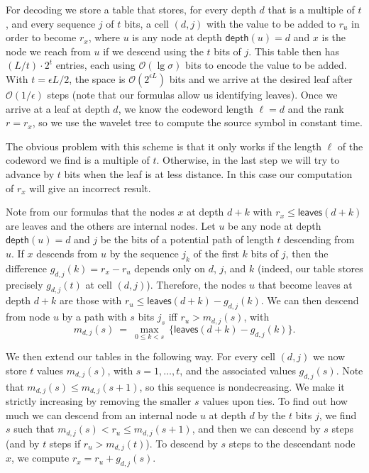 \documentclass[preprint,12pt]{elsarticle}
\newcommand{\Oh}[1]{\ensuremath{\mathcal{O}\!\left({#1}\right)}}
\newcommand{\depth}{\ensuremath{\mathsf{depth}}}
\newcommand{\leaves}{\ensuremath{\mathsf{leaves}}}
\begin{document}
For decoding we store a table that stores, for every depth $d$ that is a 
multiple of $t$, and every sequence $j$ of $t$ bits, a cell $(d,j)$ with
the value to be added to $r_u$ in order to become $r_x$, where $u$ is any
node at depth $\depth(u)=d$ and $x$ is the node we reach from $u$ if we 
descend using the $t$ bits of $j$.  This table then has $(L/t) \cdot 2^t$ 
entries, each using $\Oh{\lg\sigma}$ bits to encode the value to be added. 
With $t=\epsilon L/2$, the space is $\Oh{2^{\epsilon L}}$ bits and we arrive 
at the desired leaf after $\Oh{1/\epsilon}$ steps (note that our formulas allow 
us identifying leaves). Once we arrive at a leaf at depth $d$, we know the 
codeword length $\ell=d$ and the rank $r=r_x$, so we use the wavelet tree to 
compute the source symbol in constant time.

The obvious problem with this scheme is that it only works if the length $\ell$
of the codeword we find is a multiple of $t$. Otherwise,
in the last step we will try to advance by $t$ bits when the leaf is at less
distance. In this case our computation of $r_x$ will give an incorrect result.

Note from our formulas that the nodes $x$ at depth $d+k$ with
$r_x \le \leaves(d+k)$ are leaves and the others are internal nodes.
Let $u$ be any node at depth $\depth(u)=d$ and $j$ be the bits of a potential
path of length $t$ descending from $u$. If $x$ descends from $u$ by the sequence
$j_k$ of the first $k$ bits of $j$, then the difference 
$g_{d,j}(k) = r_x - r_u$ depends only on $d$, $j$, and $k$ (indeed, our table 
stores precisely $g_{d,j}(t)$ at cell $(d,j)$). Therefore, the nodes $u$ that 
become 
leaves at depth $d+k$ are those with $r_u \le \leaves(d+k) - g_{d,j}(k)$. We can
then descend from node $u$ by a path with $s$ bits $j_s$ iff $r_u > m_{d,j}(s)$,
with
$$ m_{d,j}(s) ~=~ \max_{0 \le k < s} ~ \{ \leaves(d+k) - g_{d,j}(k) \}.$$

We then extend our tables in the following way. For every cell $(d,j)$ we
now store $t$ values $m_{d,j}(s)$, with $s=1,\ldots,t$, and the associated 
values $g_{d,j}(s)$. Note that $m_{d,j}(s) \le m_{d,j}(s+1)$, so this sequence 
is nondecreasing. We make it strictly increasing by removing the smaller $s$ 
values upon ties. To find out how much we can descend from an internal node 
$u$ at depth $d$ by the $t$ bits $j$, 
we find $s$ such that $m_{d,j}(s) < r_u \le m_{d,j}(s+1)$, and then we can 
descend by $s$ steps (and by $t$ steps if $r_u > m_{d,j}(t)$). To descend by
$s$ steps to the descendant node $x$, we compute $r_x = r_u + g_{d,j}(s)$.
\end{document}

